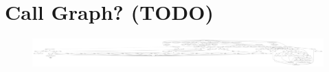 \chapter{Call Graph? (TODO)}
\newpage
\begin{figure}[H]
    \centering
    \includegraphics*[viewport=0 0 2250 1500, angle=90, width=\linewidth]{Images/transfer_init.pdf}
    \caption{} 
\end{figure} 
{}
\listoffigures
